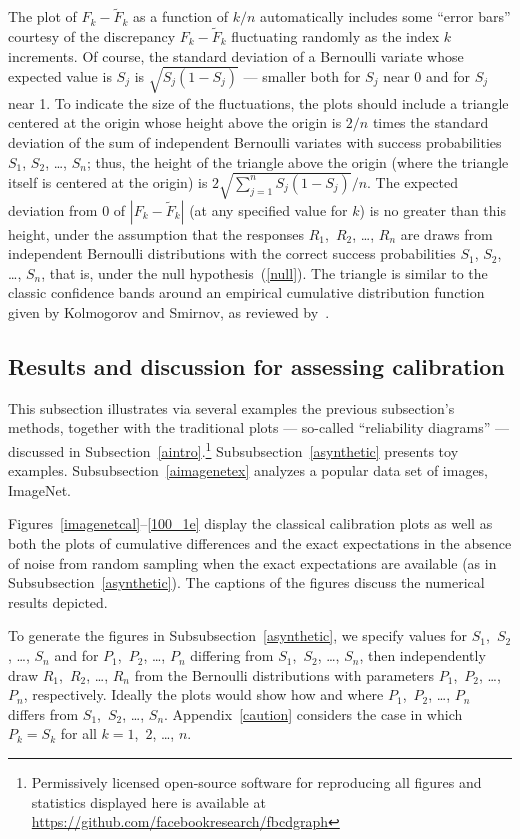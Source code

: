 \documentclass{article}
\begin{document}
The plot of $F_k-\tilde{F}_k$ as a function of $k/n$ automatically
includes some ``error bars'' courtesy of the discrepancy
$F_k-\tilde{F}_k$ fluctuating randomly as the index $k$ increments.
Of course, the standard deviation of a Bernoulli variate
whose expected value is $S_j$ is $\sqrt{S_j (1-S_j)}$ ---
smaller both for $S_j$ near 0 and for $S_j$ near 1.
To indicate the size of the fluctuations, the plots should include
a triangle centered at the origin whose height above the origin is $2/n$
times the standard deviation of the sum of independent Bernoulli variates
with success probabilities $S_1$, $S_2$, \dots, $S_n$;
thus, the height of the triangle above the origin 
(where the triangle itself is centered at the origin) is
$2 \sqrt{\sum_{j=1}^n S_j (1-S_j)} / n$.
The expected deviation from 0 of $|F_k-\tilde{F}_k|$
(at any specified value for $k$)
is no greater than this height, under the assumption that the responses
$R_1$,~$R_2$, \dots, $R_n$ are draws
from independent Bernoulli distributions with the correct success probabilities
$S_1$, $S_2$, \dots, $S_n$, that is, under the null hypothesis~(\ref{null}).
The triangle is similar to the classic confidence bands
around an empirical cumulative distribution function
given by Kolmogorov and Smirnov, as reviewed by~\cite{doksum}.


\subsection{Results and discussion for assessing calibration}
\label{aresults}

This subsection illustrates via several examples
the previous subsection's methods,
together with the traditional plots --- so-called ``reliability diagrams'' ---
discussed in Subsection~\ref{aintro}.\footnote{Permissively licensed
open-source software for reproducing all figures and statistics displayed here
is available at \url{https://github.com/facebookresearch/fbcdgraph}}
Subsubsection~\ref{asynthetic} presents toy examples.
Subsubsection~\ref{aimagenetex} analyzes a popular data set of images,
ImageNet.

Figures~\ref{imagenetcal}--\ref{100_1e} display the classical calibration plots
as well as both the plots of cumulative differences and the exact expectations
in the absence of noise from random sampling when the exact expectations
are available (as in Subsubsection~\ref{asynthetic}).
The captions of the figures discuss the numerical results depicted.

To generate the figures in Subsubsection~\ref{asynthetic},
we specify values for $S_1$,~$S_2$, \dots, $S_n$
and for $P_1$,~$P_2$, \dots, $P_n$ differing from $S_1$,~$S_2$, \dots, $S_n$,
then independently draw $R_1$,~$R_2$, \dots, $R_n$
from the Bernoulli distributions with parameters $P_1$,~$P_2$, \dots, $P_n$,
respectively. Ideally the plots would show how and where 
$P_1$,~$P_2$, \dots, $P_n$ differs from $S_1$,~$S_2$, \dots, $S_n$.
Appendix~\ref{caution} considers the case in which $P_k = S_k$
for all $k = 1$,~$2$, \dots, $n$.
\end{document}
